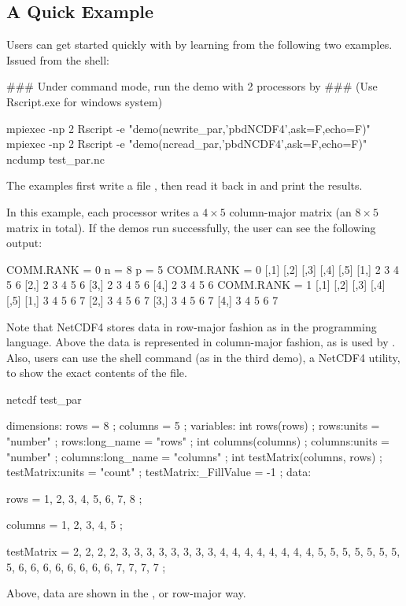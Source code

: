 \subsection[A Quick Example]{A Quick Example}
\label{sec:quick_example}

Users can get started quickly with  by learning from the following two examples.  Issued from the shell:
\begin{Command}
### Under command mode, run the demo with 2 processors by
### (Use Rscript.exe for windows system)

mpiexec -np 2 Rscript -e "demo(ncwrite_par,'pbdNCDF4',ask=F,echo=F)"
mpiexec -np 2 Rscript -e "demo(ncread_par,'pbdNCDF4',ask=F,echo=F)"
ncdump test_par.nc
\end{Command}
The examples first write a file , then read it back in and print the results.

In this example, each processor writes a $4\times 5$ column-major matrix (an $8\times 5$ matrix in total).  If the demos run successfully, the user can see the following output:
\begin{CodeOutput}[title=Output of \code{ncread}]
COMM.RANK = 0
n = 8 p = 5
COMM.RANK = 0
     [,1] [,2] [,3] [,4] [,5]
[1,]    2    3    4    5    6
[2,]    2    3    4    5    6
[3,]    2    3    4    5    6
[4,]    2    3    4    5    6
COMM.RANK = 1
     [,1] [,2] [,3] [,4] [,5]
[1,]    3    4    5    6    7
[2,]    3    4    5    6    7
[3,]    3    4    5    6    7
[4,]    3    4    5    6    7
\end{CodeOutput}

Note that NetCDF4 stores data in row-major fashion as in the  programming language.  Above the data is represented in column-major fashion, as is used by . Also, users can use the shell command  (as in the third demo), a NetCDF4 utility, to show the exact contents of the  file.
\begin{CodeOutput}[title=Output of \code{ncdump}]
netcdf test_par {
dimensions:
	rows = 8 ;
	columns = 5 ;
variables:
	int rows(rows) ;
		rows:units = "number" ;
		rows:long_name = "rows" ;
	int columns(columns) ;
		columns:units = "number" ;
		columns:long_name = "columns" ;
	int testMatrix(columns, rows) ;
		testMatrix:units = "count" ;
		testMatrix:_FillValue = -1 ;
data:

 rows = 1, 2, 3, 4, 5, 6, 7, 8 ;

 columns = 1, 2, 3, 4, 5 ;

 testMatrix =
  2, 2, 2, 2, 3, 3, 3, 3,
  3, 3, 3, 3, 4, 4, 4, 4,
  4, 4, 4, 4, 5, 5, 5, 5,
  5, 5, 5, 5, 6, 6, 6, 6,
  6, 6, 6, 6, 7, 7, 7, 7 ;
}
\end{CodeOutput}
Above, data are shown in the , or row-major way.

